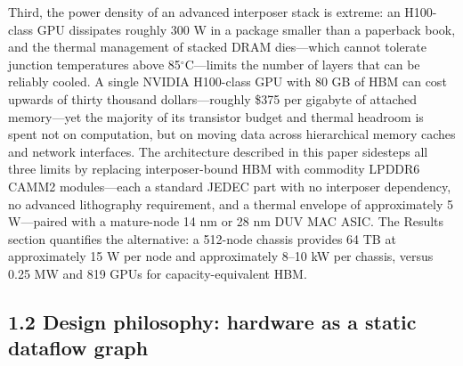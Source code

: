 \documentclass[10pt,twocolumn]{article}
\begin{document}
Third, the power density of an advanced interposer stack is extreme: an H100-class GPU dissipates roughly 300 W in a package smaller than a paperback book, and the thermal management of stacked DRAM dies---which cannot tolerate junction temperatures above 85$^\circ$C---limits the number of layers that can be reliably cooled. A single NVIDIA H100-class GPU with 80 GB of HBM can cost upwards of thirty thousand dollars---roughly \$375 per gigabyte of attached memory---yet the majority of its transistor budget and thermal headroom is spent not on computation, but on moving data across hierarchical memory caches and network interfaces\cite{2}. The architecture described in this paper sidesteps all three limits by replacing interposer-bound HBM with commodity LPDDR6 CAMM2 modules\cite{16,17}---each a standard JEDEC part with no interposer dependency, no advanced lithography requirement, and a thermal envelope of approximately 5 W---paired with a mature-node 14 nm or 28 nm DUV MAC ASIC. The Results section quantifies the alternative: a 512-node chassis provides 64 TB at approximately 15 W per node and approximately 8--10 kW per chassis, versus 0.25 MW and 819 GPUs for capacity-equivalent HBM.

\subsection*{1.2 Design philosophy: hardware as a static dataflow graph}\label{sec:1.2}
\end{document}
